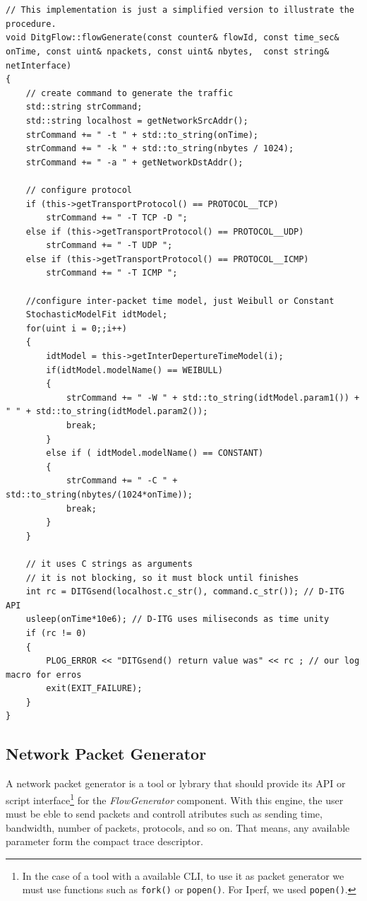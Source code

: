 \begin{verbatim}


// This implementation is just a simplified version to illustrate the procedure.
void DitgFlow::flowGenerate(const counter& flowId, const time_sec& onTime, const uint& npackets, const uint& nbytes,  const string& netInterface)
{
	// create command to generate the traffic
	std::string strCommand;
	std::string localhost = getNetworkSrcAddr(); 
	strCommand += " -t " + std::to_string(onTime); 
	strCommand += " -k " + std::to_string(nbytes / 1024);
	strCommand += " -a " + getNetworkDstAddr();
	
	// configure protocol
	if (this->getTransportProtocol() == PROTOCOL__TCP)
		strCommand += " -T TCP -D ";
	else if (this->getTransportProtocol() == PROTOCOL__UDP)
		strCommand += " -T UDP ";
	else if (this->getTransportProtocol() == PROTOCOL__ICMP)
		strCommand += " -T ICMP ";
		
	//configure inter-packet time model, just Weibull or Constant
	StochasticModelFit idtModel;
	for(uint i = 0;;i++)
	{	
		idtModel = this->getInterDepertureTimeModel(i);
		if(idtModel.modelName() == WEIBULL)
		{
			strCommand += " -W " + std::to_string(idtModel.param1()) + " " + std::to_string(idtModel.param2());
			break;
		}
		else if ( idtModel.modelName() == CONSTANT)
		{
			strCommand += " -C " + std::to_string(nbytes/(1024*onTime));
			break;
		}
	}
	
	// it uses C strings as arguments
	// it is not blocking, so it must block until finishes
	int rc = DITGsend(localhost.c_str(), command.c_str()); // D-ITG API
    usleep(onTime*10e6); // D-ITG uses miliseconds as time unity
	if (rc != 0)
	{
		PLOG_ERROR << "DITGsend() return value was" << rc ; // our log macro for erros
		exit(EXIT_FAILURE);
	}
}
\end{verbatim}


\subsection{Network Packet Generator}


A network packet generator is a tool or lybrary that should provide its API or script interface\footnote{In the case of a tool with a available CLI, to use it as packet generator we must use functions such as \texttt{fork()} or \texttt{popen()}. For Iperf, we used \texttt{popen()}.} for the \textit{FlowGenerator} component. With this engine, the user must be eble to send packets and controll atributes such as sending time, bandwidth, number of packets, protocols, and so on. That means, any available parameter form the compact trace descriptor.
 

